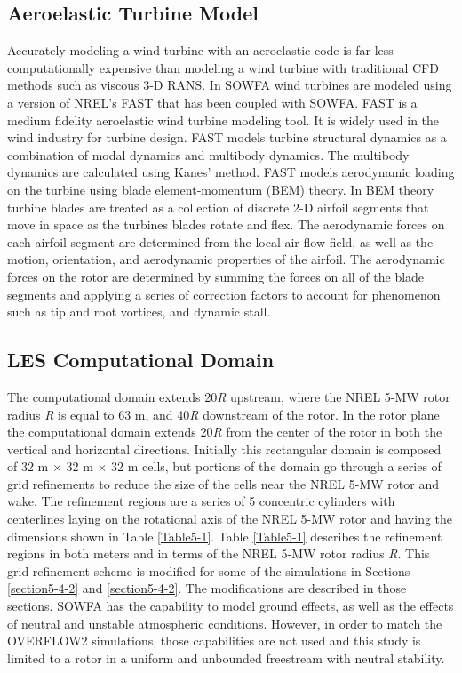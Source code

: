 \subsection{Aeroelastic Turbine Model}\label{section5-2-3}
Accurately modeling a wind turbine with an aeroelastic code is far less computationally expensive than modeling a wind turbine with traditional CFD methods such as viscous 3-D RANS. In SOWFA wind turbines are modeled using a version of NREL's FAST that has been coupled with SOWFA. FAST is a medium fidelity aeroelastic wind turbine modeling tool.  It is widely used in the wind industry for turbine design. FAST models turbine structural dynamics as a combination of modal dynamics and multibody dynamics. The multibody dynamics are calculated using Kanes' method.\cite{jonkman2013}  FAST models aerodynamic loading on the turbine using blade element-momentum (BEM) theory. In BEM theory turbine blades are treated as  a collection of discrete 2-D airfoil segments that move in space as the turbines blades rotate and flex. The aerodynamic forces on each airfoil segment are determined from the local air flow field, as well as the motion, orientation, and aerodynamic properties of the airfoil.  The aerodynamic forces on the rotor are determined by summing the forces on all of the blade segments and applying a series of correction factors to account for phenomenon such as tip and root vortices, and dynamic stall.\cite{burton2011} 


\subsection{LES Computational Domain}\label{section5-2-4}
The computational domain extends 20\emph{R} upstream, where the NREL 5-MW rotor radius \emph{R} is equal to 63 m, and 40\emph{R} downstream of the rotor. In the rotor plane the computational domain extends 20\emph{R} from the center of the rotor in both the vertical and horizontal directions. Initially this rectangular domain is composed of 32 m $\times$ 32 m $\times$ 32 m cells, but portions of the domain go through a series of grid refinements to reduce the size of the cells near the NREL 5-MW rotor and wake. The refinement regions are a series of 5 concentric cylinders with centerlines laying on the rotational axis of the NREL 5-MW rotor and having the dimensions shown in Table \ref{Table5-1}. Table \ref{Table5-1} describes the refinement regions in both meters and in terms of the NREL 5-MW rotor radius \emph{R}. This grid refinement scheme is modified for some of the simulations in Sections \ref{section5-4-2} and \ref{section5-4-2}. The modifications are described in those sections.  SOWFA has the capability to model ground effects, as well as the effects of neutral and unstable atmospheric conditions. However, in order to match the OVERFLOW2 simulations, those capabilities are not used and this study is limited to a rotor in a uniform and unbounded freestream with neutral stability.

